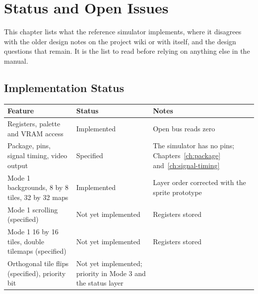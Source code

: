 \chapter{Status and Open Issues}
\label{ch:status}

This chapter lists what the reference simulator implements, where it disagrees with the older design notes on the
project wiki or with itself, and the design questions that remain. It is the list to read before relying on anything
else in the manual.

\section{Implementation Status}

\begin{table}[H]
	\centering
	\begin{tabular}{p{5.8cm}p{3.4cm}p{5.2cm}}
		\toprule
		\textbf{Feature}                                   & \textbf{Status}                                              & \textbf{Notes}                                                                  \\
		\midrule
		Registers, palette and VRAM access                 & Implemented                                                  & Open bus reads zero                                                             \\
		Package, pins, signal timing, video output         & Specified                                                    & The simulator has no pins; Chapters~\ref{ch:package} and~\ref{ch:signal-timing} \\
		Mode 1 backgrounds, 8 by 8 tiles, 32 by 32 maps    & Implemented                                                  & Layer order corrected with the sprite prototype                                 \\
		Mode 1 scrolling (specified)                       & Not yet implemented                                          & Registers stored                                                                \\
		Mode 1 16 by 16 tiles, double tilemaps (specified) & Not yet implemented                                          & Registers stored                                                                \\
		Orthogonal tile flips (specified), priority bit    & Not yet implemented; priority in Mode 3 and the status layer &                                                                                 \\

\end{tabular}
\end{table}
